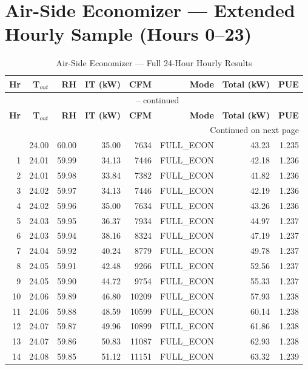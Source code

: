 \documentclass[12pt,a4paper]{report}
\begin{document}
\section{Air-Side Economizer --- Extended Hourly Sample (Hours 0--23)}

\begin{longtable}{rrrrrrrr}
\caption{Air-Side Economizer --- Full 24-Hour Hourly Results} \label{tab:air_24hr} \\
\toprule
\textbf{Hr} & \textbf{T$_{out}$} & \textbf{RH} & \textbf{IT (kW)} & \textbf{CFM} & \textbf{Mode} & \textbf{Total (kW)} & \textbf{PUE} \\
\midrule
\endfirsthead
\multicolumn{8}{c}{\tablename\ \thetable{} -- continued} \\
\toprule
\textbf{Hr} & \textbf{T$_{out}$} & \textbf{RH} & \textbf{IT (kW)} & \textbf{CFM} & \textbf{Mode} & \textbf{Total (kW)} & \textbf{PUE} \\
\midrule
\endhead
\midrule \multicolumn{8}{r}{Continued on next page} \\
\endfoot
\bottomrule
\endlastfoot
0 & 24.00 & 60.00 & 35.00 & 7634 & FULL\_ECON & 43.23 & 1.235 \\
1 & 24.01 & 59.99 & 34.13 & 7446 & FULL\_ECON & 42.18 & 1.236 \\
2 & 24.01 & 59.98 & 33.84 & 7382 & FULL\_ECON & 41.82 & 1.236 \\
3 & 24.02 & 59.97 & 34.13 & 7446 & FULL\_ECON & 42.19 & 1.236 \\
4 & 24.02 & 59.96 & 35.00 & 7634 & FULL\_ECON & 43.26 & 1.236 \\
5 & 24.03 & 59.95 & 36.37 & 7934 & FULL\_ECON & 44.97 & 1.237 \\
6 & 24.03 & 59.94 & 38.16 & 8324 & FULL\_ECON & 47.19 & 1.237 \\
7 & 24.04 & 59.92 & 40.24 & 8779 & FULL\_ECON & 49.78 & 1.237 \\
8 & 24.05 & 59.91 & 42.48 & 9266 & FULL\_ECON & 52.56 & 1.237 \\
9 & 24.05 & 59.90 & 44.72 & 9754 & FULL\_ECON & 55.33 & 1.237 \\
10 & 24.06 & 59.89 & 46.80 & 10209 & FULL\_ECON & 57.93 & 1.238 \\
11 & 24.06 & 59.88 & 48.59 & 10599 & FULL\_ECON & 60.14 & 1.238 \\
12 & 24.07 & 59.87 & 49.96 & 10899 & FULL\_ECON & 61.86 & 1.238 \\
13 & 24.07 & 59.86 & 50.83 & 11087 & FULL\_ECON & 62.93 & 1.238 \\
14 & 24.08 & 59.85 & 51.12 & 11151 & FULL\_ECON & 63.32 & 1.239 \\

\end{longtable}
\end{document}
